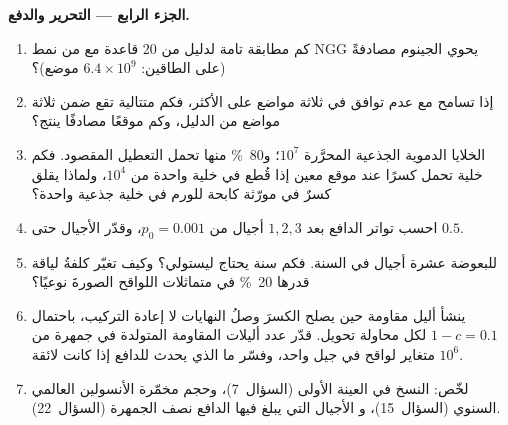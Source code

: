 \begin{problem}
\medskip
\noindent\textbf{الجزء الرابع --- التحرير والدفع.}
\begin{enumerate}[resume]
  \item كم مطابقة تامة لدليل من 20 قاعدة مع  من نمط NGG يحوي
        الجينوم مصادفةً (على الطاقين: $6.4\times 10^{9}$
        موضع)؟
  \item إذا تسامح  مع عدم توافق في ثلاثة مواضع على الأكثر، فكم متتالية
        تقع ضمن ثلاثة مواضع من الدليل، وكم موقعًا مصادفًا  ينتج؟
  \item الخلايا الدموية الجذعية المحرَّرة $10^{7}$؛ و\qty{80}{\%} منها تحمل
        التعطيل المقصود. فكم خلية تحمل كسرًا 
        عند موقع معين إذا قُطع في خلية واحدة من $10^{4}$،
        ولماذا يقلق كسرٌ في مورّثة كابحة للورم في خلية جذعية
        واحدة؟
  \item احسب تواتر الدافع بعد $1, 2, 3$ أجيال من
        $p_{0} = 0.001$، وقدّر الأجيال حتى $0.5$.
  \item للبعوضة عشرة أجيال في السنة. فكم سنة يحتاج ليستولي؟
        وكيف تغيّر كلفةُ لياقة قدرها \qty{20}{\%} في متماثلات اللواقح
        الصورةَ نوعيًا؟
  \item ينشأ أليل مقاومة حين يصلح الكسرَ وصلُ النهايات لا إعادة التركيب،
        باحتمال $1 - c = 0.1$ لكل محاولة تحويل. قدّر عدد
        أليلات المقاومة المتولدة في جمهرة من $10^{6}$ متغاير لواقح في جيل واحد،
        وفسّر ما الذي يحدث للدافع إذا كانت لائقة.
  \item لخّص: النسخ في العينة الأولى (السؤال~7)، وحجم
        مخمّرة الأنسولين العالمي السنوي (السؤال~15)، و
        الأجيال التي يبلغ فيها الدافع نصف الجمهرة
        (السؤال~22).
\end{enumerate}
\end{problem}
